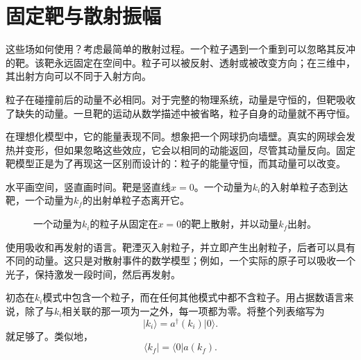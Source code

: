 
\section{固定靶与散射振幅}

这些场如何使用？考虑最简单的散射过程。一个粒子遇到一个重到可以忽略其反冲的靶。该靶永远固定在空间中。粒子可以被反射、透射或被改变方向；在三维中，其出射方向可以不同于入射方向。

粒子在碰撞前后的动量不必相同。对于完整的物理系统，动量是守恒的，但靶吸收了缺失的动量。一旦靶的运动从数学描述中被省略，粒子自身的动量就不再守恒。

在理想化模型中，它的能量表现不同。想象把一个网球扔向墙壁。真实的网球会发热并变形，但如果忽略这些效应，它会以相同的动能返回，尽管其动量反向。固定靶模型正是为了再现这一区别而设计的：粒子的能量守恒，而其动量可以改变。

水平画空间，竖直画时间。靶是竖直线\(x=0\)。一个动量为\(k_i\)的入射单粒子态到达靶，一个动量为\(k_f\)的出射单粒子态离开它。

\begin{figure}[h]
\centering
{}
\caption{一个动量为\(k_i\)的粒子从固定在\(x=0\)的靶上散射，并以动量\(k_f\)出射。}
\end{figure}

使用吸收和再发射的语言。靶湮灭入射粒子，并立即产生出射粒子，后者可以具有不同的动量。这只是对散射事件的数学模型；例如，一个实际的原子可以吸收一个光子，保持激发一段时间，然后再发射。

\begin{classroomqa}
\end{classroomqa}

初态在\(k_i\)模式中包含一个粒子，而在任何其他模式中都不含粒子。用占据数语言来说，除了与\(k_i\)相关联的那一项为一之外，每一项都为零。将整个列表缩写为
\begin{equation}
\lvert k_i\rangle=a^\dagger(k_i)\lvert0\rangle.
\end{equation}
就足够了。类似地，
\begin{equation}
\langle k_f\rvert=\langle0\rvert a(k_f).
\end{equation}

